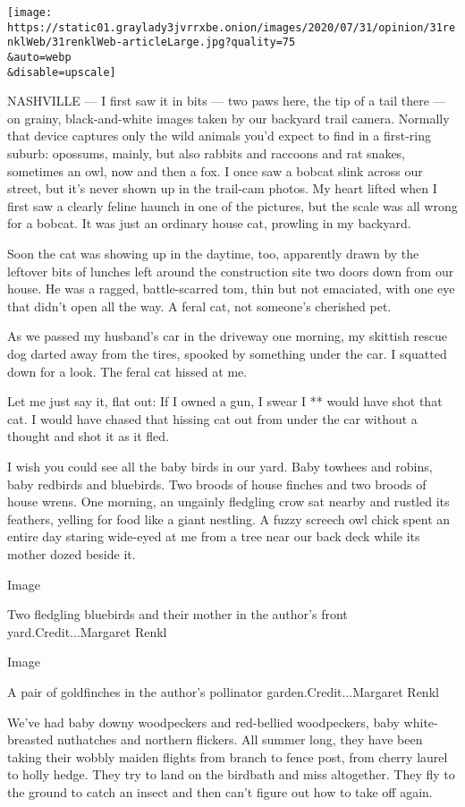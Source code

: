 \texttt{[image: https://static01.graylady3jvrrxbe.onion/images/2020/07/31/opinion/31renklWeb/31renklWeb-articleLarge.jpg?quality=75\\\&auto=webp\\\&disable=upscale]}

NASHVILLE --- I first saw it in bits --- two paws here, the tip of a
tail there --- on grainy, black-and-white images taken by our backyard
trail camera. Normally that device captures only the wild animals you'd
expect to find in a first-ring suburb: opossums, mainly, but also
rabbits and raccoons and rat snakes, sometimes an owl, now and then a
fox. I once saw a bobcat slink across our street, but it's never shown
up in the trail-cam photos. My heart lifted when I first saw a clearly
feline haunch in one of the pictures, but the scale was all wrong for a
bobcat. It was just an ordinary house cat, prowling in my backyard.

Soon the cat was showing up in the daytime, too, apparently drawn by the
leftover bits of lunches left around the construction site two doors
down from our house. He was a ragged, battle-scarred tom, thin but not
emaciated, with one eye that didn't open all the way. A feral cat, not
someone's cherished pet.

As we passed my husband's car in the driveway one morning, my skittish
rescue dog darted away from the tires, spooked by something under the
car. I squatted down for a look. The feral cat hissed at me.

Let me just say it, flat out: If I owned a gun, I swear I ** would have
shot that cat. I would have chased that hissing cat out from under the
car without a thought and shot it as it fled.

I wish you could see all the baby birds in our yard. Baby towhees and
robins, baby redbirds and bluebirds. Two broods of house finches and two
broods of house wrens. One morning, an ungainly fledgling crow sat
nearby and rustled its feathers, yelling for food like a giant nestling.
A fuzzy screech owl chick spent an entire day staring wide-eyed at me
from a tree near our back deck while its mother dozed beside it.

Image

Two fledgling bluebirds and their mother in the author's front
yard.Credit...Margaret Renkl

Image

A pair of goldfinches in the author's pollinator
garden.Credit...Margaret Renkl

We've had baby downy woodpeckers and red-bellied woodpeckers, baby
white-breasted nuthatches and northern flickers. All summer long, they
have been taking their wobbly maiden flights from branch to fence post,
from cherry laurel to holly hedge. They try to land on the birdbath and
miss altogether. They fly to the ground to catch an insect and then
can't figure out how to take off again.

